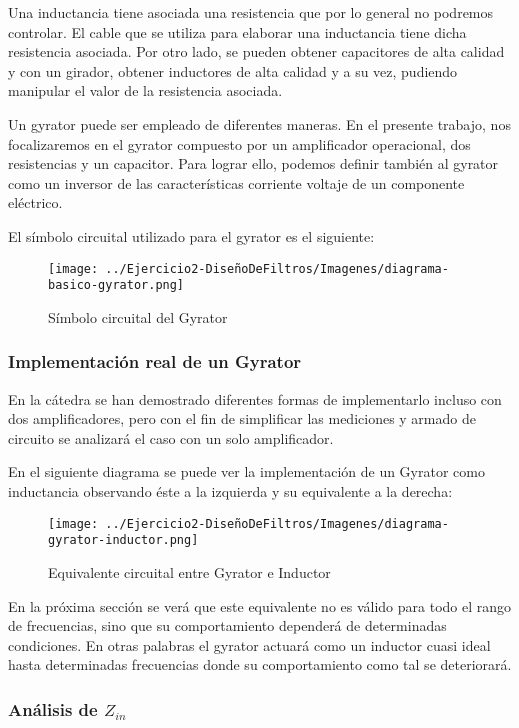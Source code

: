 Una inductancia tiene asociada una resistencia que por lo general no podremos controlar. El cable que se utiliza para elaborar una inductancia tiene dicha resistencia asociada. 
Por otro lado, se pueden obtener capacitores de alta calidad y con un girador, obtener inductores de alta calidad y a su vez, pudiendo manipular el valor de la resistencia asociada.

Un gyrator puede ser empleado de diferentes maneras. En el presente trabajo, nos focalizaremos en el gyrator compuesto por un amplificador operacional, dos resistencias y un capacitor.
Para lograr ello, podemos definir también al gyrator como un inversor de las características corriente voltaje de un componente eléctrico.

El símbolo circuital utilizado para el gyrator es el siguiente:

\begin{figure}[H]
    \centering
    \texttt{[image: ../Ejercicio2-DiseñoDeFiltros/Imagenes/diagrama-basico-gyrator.png]}
    \caption{Símbolo circuital del Gyrator}
\end{figure}

\subsubsection{Implementación real de un Gyrator}

En la cátedra se han demostrado diferentes formas de implementarlo incluso con dos amplificadores, pero con el fin de simplificar las mediciones
y armado de circuito se analizará el caso con un solo amplificador.

En el siguiente diagrama se puede ver la implementación de un Gyrator como inductancia observando éste a la izquierda y su equivalente a la derecha:

\begin{figure}[H]
    \centering
    \texttt{[image: ../Ejercicio2-DiseñoDeFiltros/Imagenes/diagrama-gyrator-inductor.png]}
    \caption{Equivalente circuital entre Gyrator e Inductor}
\end{figure}

En la próxima sección se verá que este equivalente no es válido para todo el rango de frecuencias, sino que su comportamiento dependerá de 
determinadas condiciones. En otras palabras el gyrator actuará como un inductor cuasi ideal hasta determinadas frecuencias donde su comportamiento 
como tal se deteriorará.

\subsubsection{Análisis de $Z_{in}$}

